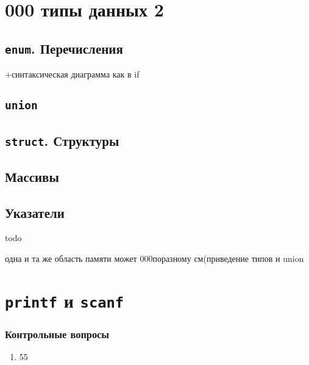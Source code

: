 \documentclass[myc.tex]{subfiles}
\begin{document}
\chapter{000 типы данных 2}
\section{\texttt{enum}. Перечисления}
+синтаксическая диаграмма как в if
\section{\texttt{union}}
\section{\texttt{struct}. Структуры}
\section{Массивы}
\section{Указатели}








todo

одна и та же область памяти может 000поразному см(приведение типов и union







\chapter{\texttt{printf} и \texttt{scanf}}
\subsection*{Контрольные вопросы}
\begin{enumerate}
\item 55
\end{enumerate}
\end{document}
